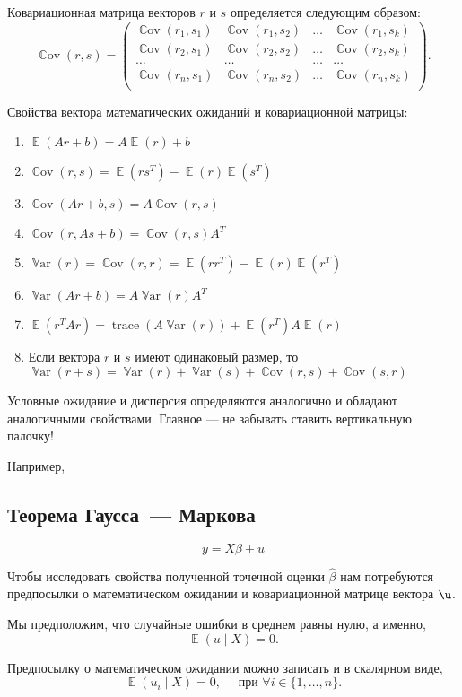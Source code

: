 \documentclass[12pt]{article}
\DeclareMathOperator{\Cov}{\mathbb{C}ov}
\DeclareMathOperator{\Var}{\mathbb{V}ar}
\DeclareMathOperator{\E}{\mathbb{E}}
\DeclareMathOperator{\trace}{trace}
\newcommand{\hb}{\hat{\beta}}
\begin{document}
Ковариационная матрица векторов $r$ и $s$ определяется следующим образом:
\[
\Cov(r,s) = \begin{pmatrix}
	\Cov(r_1,s_1) & \Cov(r_1,s_2) & \dots & \Cov(r_1,s_k) \\
	\Cov(r_2,s_1) & \Cov(r_2,s_2) & \dots & \Cov(r_2,s_k) \\
        \dots & \dots & \dots & \dots\\
        \Cov(r_n,s_1) & \Cov(r_n,s_2) & \dots & \Cov(r_n,s_k) \\
      \end{pmatrix}.
\]

Свойства вектора математических ожиданий и ковариационной матрицы:
\begin{enumerate}
    \item $\E(Ar+b) = A\E(r)+b$
    \item $\Cov(r,s) = \E(rs^T)-\E(r)\E(s^T)$
    \item $\Cov(Ar+b,s) = A\Cov(r,s)$
    \item $\Cov(r,As+b) = \Cov(r,s)A^T$
    \item $\Var(r)=\Cov(r,r) = \E(rr^T)-\E(r)\E(r^T)$
    \item $\Var(Ar+b) = A\Var(r)A^T$
    \item $\E(r^T Ar) = \trace(A\Var(r))+\E(r^T) A\E(r)$  
    \item Если вектора $r$ и $s$ имеют одинаковый размер, то
    $\Var(r + s) = \Var(r) + \Var(s) + \Cov(r, s) + \Cov(s, r)$
\end{enumerate}

Условные ожидание и дисперсия определяются аналогично и обладают аналогичными свойствами.
Главное — не забывать ставить вертикальную палочку!

Например, 



\subsection{Теорема Гаусса~— Маркова}

\[y = X\beta + u\]

Чтобы исследовать свойства полученной точечной оценки $\hb$ нам потребуются предпосылки о математическом ожидании и ковариационной матрице вектора $\u$.

Мы предположим, что случайные ошибки в среднем равны нулю, а именно,
\[
\E(u \mid X) = 0.
\]


Предпосылку о математическом ожидании можно записать и в скалярном виде,
\[
\E(u_i \mid X) = 0, \quad \text{ при } \forall i \in \{1, \dots, n\}.
\]
\end{document}
